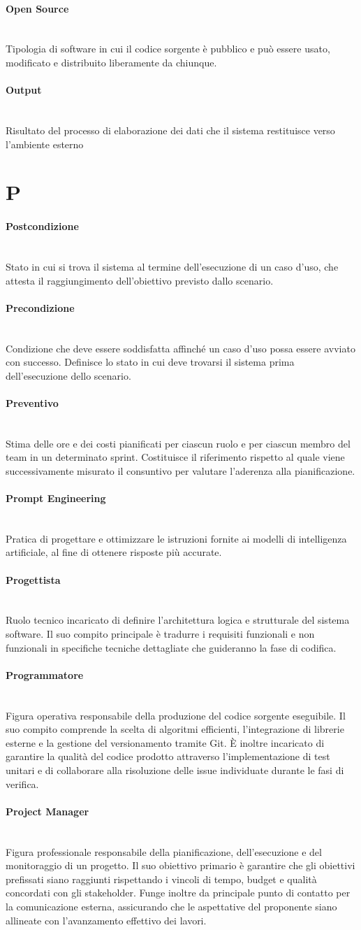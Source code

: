 \documentclass[a4paper, 10pt, colorlinks=true, linkcolor=black, urlcolor=blue, citecolor=blue, hidelinks]{article}
\newcommand{\glossaryterm}[2]{
    \paragraph{#1 \label{term:#1}} \mbox{} \\
    #2
    \vspace{0.5em}
}
\begin{document}
\glossaryterm{Open Source}{Tipologia di software in cui il codice sorgente è pubblico e può essere usato, modificato e distribuito liberamente da chiunque.}

\glossaryterm{Output}{Risultato del processo di elaborazione dei dati che il sistema restituisce verso l'ambiente esterno}

\newpage

\section*{P}

\glossaryterm{Postcondizione}{Stato in cui si trova il sistema al termine dell'esecuzione di un caso d'uso, che attesta il raggiungimento dell'obiettivo previsto dallo scenario.}

\glossaryterm{Precondizione}{Condizione che deve essere soddisfatta affinché un caso d'uso possa essere avviato con successo. Definisce lo stato in cui deve trovarsi il sistema prima dell'esecuzione dello scenario.}

\glossaryterm{Preventivo}{Stima delle ore e dei costi pianificati per ciascun ruolo e per ciascun membro del team in un determinato sprint. Costituisce il riferimento rispetto al quale viene successivamente misurato il consuntivo per valutare l'aderenza alla pianificazione.}

\glossaryterm{Prompt Engineering}{Pratica di progettare e ottimizzare le istruzioni fornite ai modelli di intelligenza artificiale, al fine di ottenere risposte più accurate.}

\glossaryterm{Progettista}{Ruolo tecnico incaricato di definire l'architettura logica e strutturale del sistema software. Il suo compito principale è tradurre i requisiti funzionali e non funzionali in specifiche tecniche dettagliate che guideranno la fase di codifica.}

\glossaryterm{Programmatore}{Figura operativa responsabile della produzione del codice sorgente eseguibile. Il suo compito comprende la scelta di algoritmi efficienti, l'integrazione di librerie esterne e la gestione del versionamento tramite Git. È inoltre incaricato di garantire la qualità del codice prodotto attraverso l'implementazione di test unitari e di collaborare alla risoluzione delle issue individuate durante le fasi di verifica.}

\glossaryterm{Project Manager}{Figura professionale responsabile della pianificazione, dell'esecuzione e del monitoraggio di un progetto. Il suo obiettivo primario è garantire che gli obiettivi prefissati siano raggiunti rispettando i vincoli di tempo, budget e qualità concordati con gli stakeholder. Funge inoltre da principale punto di contatto per la comunicazione esterna, assicurando che le aspettative del proponente siano allineate con l'avanzamento effettivo dei lavori.}
\end{document}
